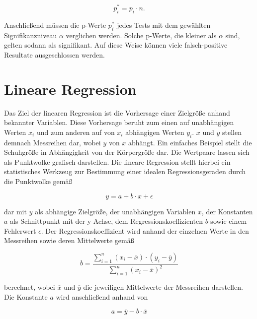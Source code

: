 \begin{equation}
p_{i}^{*} = p_i \cdot n.
\end{equation}

Anschließend müssen die p-Werte $p_{i}^{*}$ jedes Tests mit dem gewählten Signifikanzniveau $\alpha$ verglichen werden. Solche p-Werte, die kleiner als $\alpha$ sind, gelten sodann als signifikant. Auf diese Weise können viele falsch-positive Resultate ausgeschlossen werden. \parencite{hedderich_angewandte_2016}

\section{Lineare Regression}

Das Ziel der linearen Regression ist die Vorhersage einer Zielgröße anhand bekannter Variablen. Diese Vorhersage beruht zum einen auf unabhängigen Werten $x_i$ und zum anderen auf von $x_i$ abhängigen Werten $y_i$. $x$ und $y$ stellen demnach Messreihen dar, wobei $y$ von $x$ abhängt. Ein einfaches Beispiel stellt die Schuhgröße in Abhängigkeit von der Körpergröße dar. Die Wertpaare lassen sich als Punktwolke grafisch darstellen. Die lineare Regression stellt hierbei ein statistisches Werkzeug zur Bestimmung einer idealen Regressionsgeraden durch die Punktwolke gemäß

\begin{equation}
y = a + b \cdot x + \epsilon
	\label{eq:linreg}
\end{equation}

dar mit $y$ als abhängige Zielgröße, der unabhängigen Variablen $x$, der Konstanten $a$ als Schnittpunkt mit der y-Achse, dem Regressionskoeffizienten $b$ sowie einem Fehlerwert $\epsilon$. Der Regressionskoeffizient wird anhand der einzelnen Werte in den Messreihen sowie deren Mittelwerte gemäß

\begin{equation}
b = \frac{\sum \limits_{i=1}^n(x_i-\overline{x}) \cdot (y_i-\overline{y})}{\sum \limits_{i=1}^n(x_i-\overline{x})^2} 
	\label{eq:regcoef}
\end{equation}

berechnet, wobei $\overline{x}$ und $\overline{y}$ die jeweiligen Mittelwerte der Messreihen darstellen. Die Konstante $a$ wird anschließend anhand von 

\begin{equation}
a = \overline{y} - b \cdot \overline{x}
	\label{eq:konstante}
\end{equation}

